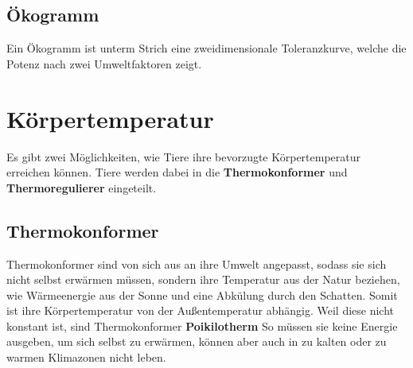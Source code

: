 \documentclass{article}
\begin{document}
\begin{figure}[h] 
  \centering
\end{figure} 
 
\subsection{Ökogramm}
Ein Ökogramm ist unterm Strich eine zweidimensionale Toleranzkurve, welche die Potenz nach zwei Umweltfaktoren zeigt.
  
\section{Körpertemperatur}
Es gibt zwei Möglichkeiten, wie Tiere ihre bevorzugte Körpertemperatur erreichen können. Tiere werden dabei in die \textbf{Thermokonformer} und \textbf{Thermoregulierer} eingeteilt.
 
\subsection{Thermokonformer}
Thermokonformer sind von sich aus an ihre Umwelt angepasst, sodass sie sich nicht selbst erwärmen müssen, sondern ihre Temperatur aus der Natur beziehen, wie Wärmeenergie aus der Sonne und eine Abkülung durch den Schatten. Somit ist ihre Körpertemperatur von der Außentemperatur abhängig. Weil diese nicht konstant ist, sind Thermokonformer \textbf{Poikilotherm} \newline
So müssen sie keine Energie ausgeben, um sich selbst zu erwärmen, können aber auch in zu kalten oder zu warmen Klimazonen nicht leben.
 
\end{document}
